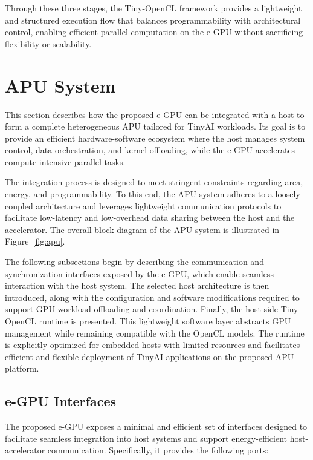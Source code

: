             Through these three stages, the \mbox{Tiny-OpenCL} framework provides a lightweight and structured execution flow that balances programmability with architectural control, enabling efficient parallel computation on the \mbox{e-GPU} without sacrificing flexibility or scalability.

    \section{APU System} 
    \label{sec:apu_system}
    
        This section describes how the proposed \mbox{e-GPU} can be integrated with a host to form a complete heterogeneous APU tailored for TinyAI workloads. Its goal is to provide an efficient hardware-software ecosystem where the host manages system control, data orchestration, and kernel offloading, while the \mbox{e-GPU} accelerates compute-intensive parallel tasks.
    
        The integration process is designed to meet stringent constraints regarding area, energy, and programmability. To this end, the APU system adheres to a loosely coupled architecture and leverages lightweight communication protocols to facilitate low-latency and low-overhead data sharing between the host and the accelerator. The overall block diagram of the APU system is illustrated in Figure~\ref{fig:apu}.
    
        The following subsections begin by describing the communication and synchronization interfaces exposed by the \mbox{e-GPU}, which enable seamless interaction with the host system. The selected host architecture is then introduced, along with the configuration and software modifications required to support GPU workload offloading and coordination. Finally, the host-side \mbox{Tiny-OpenCL} runtime is presented. This lightweight software layer abstracts GPU management while remaining compatible with the OpenCL models. The runtime is explicitly optimized for embedded hosts with limited resources and facilitates efficient and flexible deployment of TinyAI applications on the proposed APU platform.

        \subsection{e-GPU Interfaces}
        
            The proposed \mbox{e-GPU} exposes a minimal and efficient set of interfaces designed to facilitate seamless integration into host systems and support energy-efficient host-accelerator communication. Specifically, it provides the following ports:

